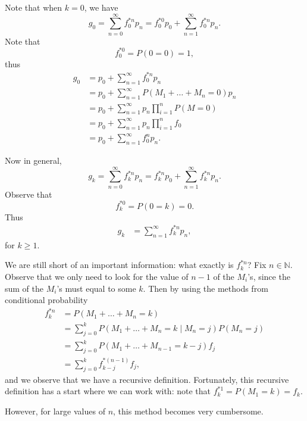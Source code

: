 \documentclass[notoc,notitlepage]{tufte-book}
\begin{document}
Note that when $k = 0$, we have
\begin{equation*}
  g_0 = \sum_{n = 0}^{\infty} f_0^{*n} p_n = f_0^{*0} p_0 + \sum_{n = 1}^{\infty} f_0^{*n} p_n.
\end{equation*}
Note that
\begin{equation*}
  f_0^{*0} = P(0 = 0) = 1,
\end{equation*}
thus
\begin{align*}
  g_0 &= p_0 + \sum_{n=1}^{\infty} f_0^{*n} p_n \\
      &= p_0 + \sum_{n=1}^{\infty} P(M_1 + \hdots + M_n = 0) p_n \\
      &= p_0 + \sum_{n=1}^{\infty} p_n \prod_{i=1}^{n} P(M = 0) \\
      &= p_0 + \sum_{n=1}^{\infty} p_n \prod_{i=1}^{n} f_0 \\
      &= p_0 + \sum_{n=1}^{\infty} f_0^n p_n.
\end{align*}

Now in general,
\begin{equation*}
  g_k = \sum_{n=0}^{\infty} f_k^{*n} p_n = f_k^{*n} p_0 + \sum_{n=1}^{\infty} f_k^{*n} p_n.
\end{equation*}
Observe that 
\begin{equation*}
  f_k^{*0} = P(0 = k) = 0.
\end{equation*}
Thus
\begin{align*}
  g_k &= \sum_{n=1}^{\infty} f_k^{*n} p_n,
\end{align*}
for $k \geq 1$.

We are still short of an important information: what exactly is $f_k^{*n}$? Fix $n \in \mathbb{N}$. Observe that we only need to look for the value of $n - 1$ of the $M_i$'s, since the sum of the $M_i$'s must equal to some $k$. Then by using the methods from conditional probability
\begin{align*}
  f_k^{*n} &= P(M_1 + \hdots + M_n = k) \\
           &= \sum_{j=0}^{k} P(M_1 + \hdots + M_n = k \mid M_n = j) P(M_n = j) \\
           &= \sum_{j=0}^{k} P(M_1 + \hdots + M_{n - 1} = k - j) f_j \\
           &= \sum_{j=0}^{k} f_{k - j}^{*( n - 1 )} f_j,
\end{align*}
and we observe that we have a recursive definition. Fortunately, this recursive definition has a start where we can work with: note that $f_k^{*1} = P( M_1 = k ) = f_k$.

However, for large values of $n$, this method becomes very cumbersome.
\end{document}
